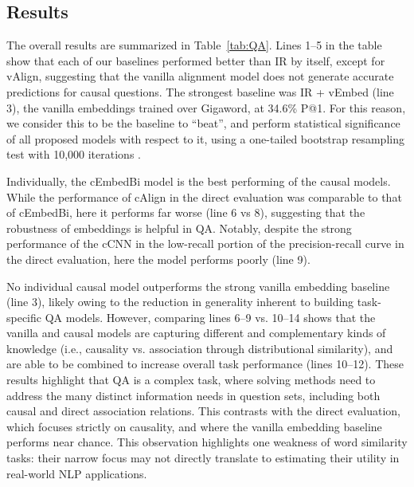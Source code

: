 \subsection{Results}
\label{sec-emnlp2016:results}
The overall results are summarized in Table~\ref{tab:QA}.
Lines 1--5 in the table show that each of our baselines performed better than IR by itself, except for vAlign, suggesting that the vanilla alignment model does not generate accurate predictions for causal questions.
The strongest baseline was IR + vEmbed (line 3), the vanilla embeddings trained over Gigaword, at 34.6\% P@1. For this reason, we consider this to be the baseline to ``beat'', and perform statistical significance of all proposed models with respect to it, using a one-tailed bootstrap resampling test with 10,000 iterations . 

Individually, the cEmbedBi model is the best performing of the causal models.  While the performance of cAlign in the direct evaluation was comparable to that of cEmbedBi, here it performs far worse (line 6 vs 8), suggesting that the robustness of embeddings is helpful in QA.  Notably, despite the strong performance of the cCNN in the low-recall portion of the precision-recall curve in the direct evaluation, here the model performs poorly (line 9).

No individual causal model outperforms the strong vanilla embedding baseline (line 3), likely owing to the reduction in generality inherent to building task-specific QA models.
However, comparing lines 6--9 vs. 10--14 shows that the vanilla and causal models are capturing different and complementary kinds of knowledge (i.e., causality vs. association through distributional similarity), and are able to be combined to increase overall task performance (lines 10--12).  These results highlight that QA is a complex task, where solving methods need to address the many distinct information needs in question sets, including both causal and direct association relations.  This contrasts with the direct evaluation, which focuses strictly on causality, and where the vanilla embedding baseline performs near chance. This observation highlights one weakness of word similarity tasks: their narrow focus may not directly translate to estimating their utility in real-world NLP applications. %


